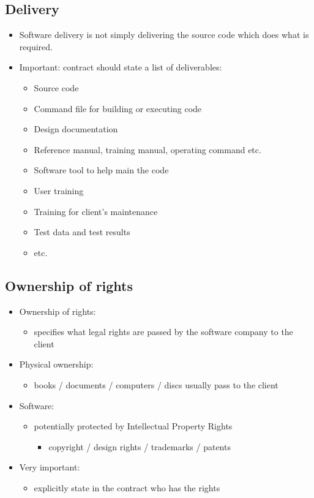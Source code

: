 \documentclass{article}
\begin{document}
\subsection{Delivery}
\begin{itemize}
\item Software delivery is not simply delivering the source code which does what is required.
\item Important: contract should state a list of deliverables:
\begin{itemize}
\item Source code
\item Command file for building or executing code
\item Design documentation
\item Reference manual, training manual, operating command etc.
\item Software tool to help main the code
\item User training
\item Training for client's maintenance
\item Test data and test results
\item etc.
\end{itemize}
\end{itemize}



\subsection{Ownership of rights}
\begin{itemize}
\item Ownership of rights:
\begin{itemize}
\item specifies what legal rights are passed by the software company to the client
\end{itemize}
\item Physical ownership:
\begin{itemize}
\item books / documents / computers / discs usually pass to the client
\end{itemize}
\item Software:
\begin{itemize}
\item potentially protected by Intellectual Property Rights
\begin{itemize}
\item copyright / design rights / trademarks / patents
\end{itemize}
\end{itemize}
\item Very important:
\begin{itemize}
\item explicitly state in the contract who has the rights
\end{itemize}
\end{itemize}
\end{document}
